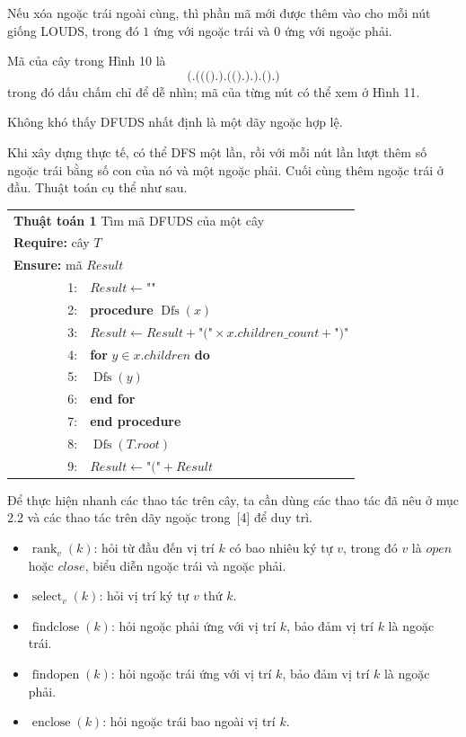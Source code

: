 \documentclass[11pt]{article}
\DeclareMathOperator{\rank}{rank}
\begin{document}
Nếu xóa ngoặc trái ngoài cùng, thì phần mã mới được thêm vào cho mỗi nút giống
LOUDS, trong đó \(1\) ứng với ngoặc trái và \(0\) ứng với ngoặc phải.

Mã của cây trong Hình 10 là
\[
  \texttt{(.((().).(().).).().)}
\]
trong đó dấu chấm chỉ để dễ nhìn; mã của từng nút có thể xem ở Hình 11.

Không khó thấy DFUDS nhất định là một dãy ngoặc hợp lệ.

Khi xây dựng thực tế, có thể DFS một lần, rồi với mỗi nút lần lượt thêm số
ngoặc trái bằng số con của nó và một ngoặc phải. Cuối cùng thêm ngoặc trái ở
đầu. Thuật toán cụ thể như sau.

\begin{center}
\small
\begin{tabular}{r@{\quad}p{0.78\linewidth}}
\multicolumn{2}{l}{\textbf{Thuật toán 1} Tìm mã DFUDS của một cây}\\
\multicolumn{2}{l}{\textbf{Require:} cây \(T\)}\\
\multicolumn{2}{l}{\textbf{Ensure:} mã \(\mathit{Result}\)}\\
1: & \(\mathit{Result}\gets\texttt{""}\)\\
2: & \textbf{procedure} \(\operatorname{Dfs}(x)\)\\
3: & \quad \(\mathit{Result}\gets \mathit{Result}
      +\texttt{"("}\times x.\mathit{children\_count}+\texttt{")"}\)\\
4: & \quad \textbf{for} \(y\in x.\mathit{children}\) \textbf{do}\\
5: & \qquad \(\operatorname{Dfs}(y)\)\\
6: & \quad \textbf{end for}\\
7: & \textbf{end procedure}\\
8: & \(\operatorname{Dfs}(T.\mathit{root})\)\\
9: & \(\mathit{Result}\gets\texttt{"("}+\mathit{Result}\)
\end{tabular}
\end{center}

Để thực hiện nhanh các thao tác trên cây, ta cần dùng các thao tác đã nêu ở
mục 2.2 và các thao tác trên dãy ngoặc trong~[4] để duy trì.

\begin{itemize}
  \item \(\rank_v(k)\): hỏi từ đầu đến vị trí \(k\) có bao nhiêu ký tự \(v\),
        trong đó \(v\) là \(\mathit{open}\) hoặc \(\mathit{close}\), biểu diễn
        ngoặc trái và ngoặc phải.
  \item \(\operatorname{select}_v(k)\): hỏi vị trí ký tự \(v\) thứ \(k\).
  \item \(\operatorname{findclose}(k)\): hỏi ngoặc phải ứng với vị trí \(k\),
        bảo đảm vị trí \(k\) là ngoặc trái.
  \item \(\operatorname{findopen}(k)\): hỏi ngoặc trái ứng với vị trí \(k\),
        bảo đảm vị trí \(k\) là ngoặc phải.
  \item \(\operatorname{enclose}(k)\): hỏi ngoặc trái bao ngoài vị trí \(k\).
\end{itemize}
\end{document}
